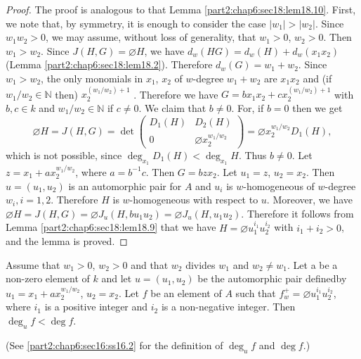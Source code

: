 \begin{proof}
  The proof is analogous to that Lemma
  \ref{part2:chap6:sec18:lem18.10}. First, we note that, by symmetry,
  it is enough to consider the case $|w_1|> |w_2|$. Since $w_1 w_2 >
  0$, we may assume, without loss of generality, that $w_1 > 0$, $w_2>
  0$. Then $w_1> w_2$. Since $J(H , G)= \diameter H$, we have $d_w
  (HG)= d_w (H) + d_w (x_1 x_2)$ (Lemma
  \ref{part2:chap6:sec18:lem18.2}). Therefore $d_w (G)= w_1+
  w_2$. Since $w_1> w_2$, the only monomials in $x_1$, $x_2$ of
  $w$-degree $w_1 + w_2$ are $x_1 x_2$ and (if $w_1/w_2 \in
  \mathbb{N}$ then) $x_2^{(w_1/w_2)+1}$ . Therefore we have $G= bx_1
  x_2 + c x_2^{(w_1/w_2)+1}$ with $b, c \in k$ and $w_1/w_2 \in
  \mathbb{N}$ if $c \neq 0$. We claim that $b \neq 0$. For, if $b=0$
  then we get 
  $$
  \diameter H = J(H, G)= \det 
  \begin{pmatrix}
    D_1 (H) & D_2 (H)\\
    0 & \diameter x_2^{w_1/w_2}
  \end{pmatrix}= \diameter x_2^{w_1/w_2} D_1 (H),
  $$
  which is not possible, since $\deg_{x_1} D_1 (H) < \deg_{x_1}
  H$. Thus $b \neq 0$. Let $z= x_1 + ax_2^{w_1/w_2}$, where $a=
  b^{-1}c$. Then $G= bz x_2$. Let $u_1= z$, $u_2= x_2$. Then $u= (u_1,
  u_2)$ is an automorphic pair for $A$ and $u_i$ is $w$-homogeneous of
  $w$-degree $w_i, i=1, 2$. Therefore $H$ is $w$-homogeneous with
  respect to $u$. Moreover, we have $\diameter H = J(H, G)= \diameter
  J_u (H, bu_1 u_2)= \diameter J_u (H, u_1 u_2)$. Therefore it follows
  from Lemma \ref{part2:chap6:sec18:lem18.9} that we have $H= \diameter
  u_1^{i_1} u_2^{i_2}$ with $i_1 + i_2 > 0$, and the lemma is proved.
\end{proof}

\begin{lemma}\label{part2:chap6:sec18:lem18.12}
  Assume that $w_1 > 0$, $w_2 > 0$ and that $w_2$ divides $w_1$ and
  $w_2 \neq w_1$. Let a be a non-zero element of $k$ and let $u= (u_1,
  u_2)$ be the automorphic pair defined\pageoriginale by $u_1 = x_1 +
  ax_2^{w_1/w_2}$, $u_2 = x_2$. Let $f$ be an element of $A$ such that
  $f_w^+ = \diameter u_1^{i_1} u_2^{i_2}$, where $i_1$ is a positive
  integer and $i_2$ is a non-negative integer. Then $\deg_u f< \deg f$.
\end{lemma}

(See \ref{part2:chap6:sec16:ss16.2} for the definition of $\deg_u f$
and $\deg f$.)

